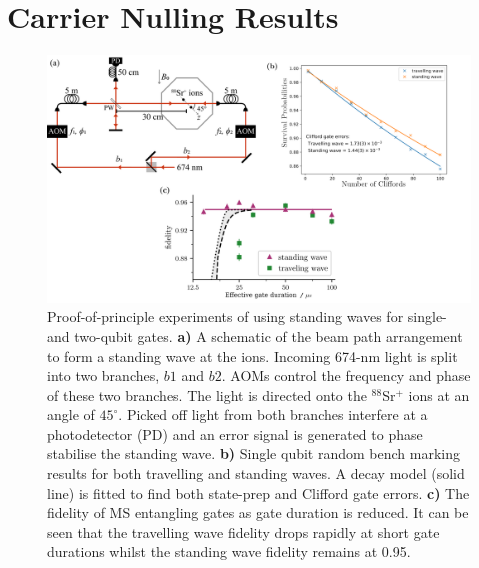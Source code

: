 \documentclass[12pt]{iopart}
\begin{document}


\section{Carrier Nulling Results}

\begin{figure}
  \begin{center}
   \noindent\includegraphics[width=\linewidth]{figures/cnulled_figs.png}
  \end{center}
  \caption{  Proof-of-principle experiments of using standing waves for single- and two-qubit gates\cite{saner_breaking_2023}.
    \textbf{a)} A schematic of the beam path arrangement to form a
    standing wave at the ions. Incoming 674-nm light is split into two
    branches, $b1$ and $b2$. AOMs control the frequency and phase of
    these two branches. The light is directed onto the $^{88}$Sr$^+$
    ions at an angle of $45^\circ.$ Picked off light from both
    branches interfere at a photodetector (PD) and an error signal is
    generated to phase stabilise the standing wave.  \textbf{b)}
    Single qubit random bench marking results for both travelling and
    standing waves. A decay model (solid line) is fitted to find both
    state-prep and Clifford gate errors.  \textbf{c)} The fidelity of
    MS entangling gates as gate duration is reduced. It can be seen
    that the travelling wave fidelity drops rapidly at short gate
    durations whilst the standing wave fidelity remains at 0.95.}


  \label{fig:cnull}
\end{figure}
\end{document}
